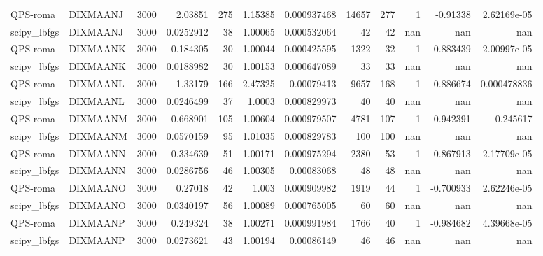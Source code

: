 \documentclass[a4paper]{article}
\begin{document}
\begin{tabular}{llrrrrrrrrrr}
	QPS-roma    & DIXMAANJ &  3000 &  2.03851    &    275 &      1.15385     & 0.000937468 &    14657 &      277 &        1 &  -0.91338     &    2.62169e-05 \\
	scipy\_lbfgs & DIXMAANJ &  3000 &  0.0252912  &     38 &      1.00065     & 0.000532064 &       42 &       42 &      nan & nan           &  nan           \\
	QPS-roma    & DIXMAANK &  3000 &  0.184305   &     30 &      1.00044     & 0.000425595 &     1322 &       32 &        1 &  -0.883439    &    2.00997e-05 \\
	scipy\_lbfgs & DIXMAANK &  3000 &  0.0188982  &     30 &      1.00153     & 0.000647089 &       33 &       33 &      nan & nan           &  nan           \\
	QPS-roma    & DIXMAANL &  3000 &  1.33179    &    166 &      2.47325     & 0.00079413  &     9657 &      168 &        1 &  -0.886674    &    0.000478836 \\
	scipy\_lbfgs & DIXMAANL &  3000 &  0.0246499  &     37 &      1.0003      & 0.000829973 &       40 &       40 &      nan & nan           &  nan           \\
	QPS-roma    & DIXMAANM &  3000 &  0.668901   &    105 &      1.00604     & 0.000979507 &     4781 &      107 &        1 &  -0.942391    &    0.245617    \\
	scipy\_lbfgs & DIXMAANM &  3000 &  0.0570159  &     95 &      1.01035     & 0.000829783 &      100 &      100 &      nan & nan           &  nan           \\
	QPS-roma    & DIXMAANN &  3000 &  0.334639   &     51 &      1.00171     & 0.000975294 &     2380 &       53 &        1 &  -0.867913    &    2.17709e-05 \\
	scipy\_lbfgs & DIXMAANN &  3000 &  0.0286756  &     46 &      1.00305     & 0.00083068  &       48 &       48 &      nan & nan           &  nan           \\
	QPS-roma    & DIXMAANO &  3000 &  0.27018    &     42 &      1.003       & 0.000909982 &     1919 &       44 &        1 &  -0.700933    &    2.62246e-05 \\
	scipy\_lbfgs & DIXMAANO &  3000 &  0.0340197  &     56 &      1.00089     & 0.000765005 &       60 &       60 &      nan & nan           &  nan           \\
	QPS-roma    & DIXMAANP &  3000 &  0.249324   &     38 &      1.00271     & 0.000991984 &     1766 &       40 &        1 &  -0.984682    &    4.39668e-05 \\
	scipy\_lbfgs & DIXMAANP &  3000 &  0.0273621  &     43 &      1.00194     & 0.00086149  &       46 &       46 &      nan & nan           &  nan           \\

\end{tabular}
\end{document}
